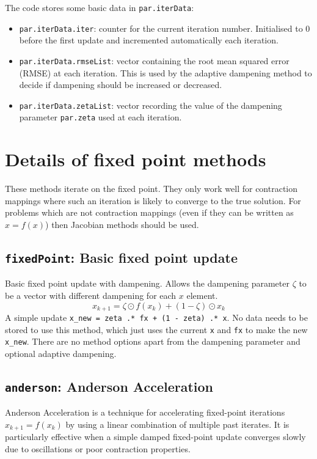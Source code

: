 \documentclass[a4paper,12pt]{article}
\newcommand{\code}[1]{\texttt{#1}}
\begin{document}
The code stores some basic data in \code{par.iterData}:
\begin{itemize}
\item \code{par.iterData.iter}: counter for the current iteration number. Initialised to $0$ before the first update and incremented automatically each iteration.  
\item \code{par.iterData.rmseList}: vector containing the root mean squared error (RMSE) at each iteration. This is used by the adaptive dampening method to decide if dampening should be increased or decreased. 
\item \code{par.iterData.zetaList}: vector recording the value of the dampening parameter \code{par.zeta} used at each iteration. 
\end{itemize}



\section{Details of fixed point methods}

These methods iterate on the fixed point. They only work well for contraction mappings where such an iteration is likely to converge to the true solution. For problems which are not contraction mappings (even if they can be written as $x=f(x)$) then Jacobian methods should be used. 

\subsection{\code{fixedPoint}: Basic fixed point update}

Basic fixed point update with dampening. Allows the dampening parameter $\zeta$ to be a vector with different dampening for each $x$ element. 
\[
x_{k+1} = \zeta \odot f(x_k) + (1-\zeta) \odot x_k
\]
A simple update \code{x\_new = zeta .* fx + (1 - zeta) .* x}. No data needs to be stored to use this method, which just uses the current \code{x} and \code{fx} to make the new \code{x\_new}. There are no method options apart from the dampening parameter and optional adaptive dampening. 


\subsection{\code{anderson}: Anderson Acceleration}

Anderson Acceleration is a technique for accelerating fixed-point iterations $x_{k+1} = f(x_k)$ by using a linear combination of multiple past iterates.  
It is particularly effective when a simple damped fixed-point update converges slowly due to oscillations or poor contraction properties.  
\end{document}
